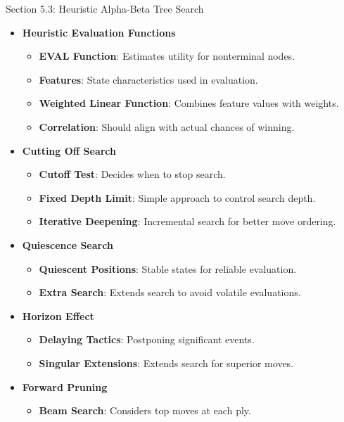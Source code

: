 \begin{notes}{Section 5.3: Heuristic Alpha-Beta Tree Search}
\begin{highlight}
        \begin{itemize}
            \item \textbf{Heuristic Evaluation Functions}
                \begin{itemize}
                    \item \textbf{EVAL Function}: Estimates utility for nonterminal nodes.
                    \item \textbf{Features}: State characteristics used in evaluation.
                    \item \textbf{Weighted Linear Function}: Combines feature values with weights.
                    \item \textbf{Correlation}: Should align with actual chances of winning.
                \end{itemize}
            \item \textbf{Cutting Off Search}
                \begin{itemize}
                    \item \textbf{Cutoff Test}: Decides when to stop search.
                    \item \textbf{Fixed Depth Limit}: Simple approach to control search depth.
                    \item \textbf{Iterative Deepening}: Incremental search for better move ordering.
                \end{itemize}
            \item \textbf{Quiescence Search}
                \begin{itemize}
                    \item \textbf{Quiescent Positions}: Stable states for reliable evaluation.
                    \item \textbf{Extra Search}: Extends search to avoid volatile evaluations.
                \end{itemize}
            \item \textbf{Horizon Effect}
                \begin{itemize}
                    \item \textbf{Delaying Tactics}: Postponing significant events.
                    \item \textbf{Singular Extensions}: Extends search for superior moves.
                \end{itemize}
            \item \textbf{Forward Pruning}
                \begin{itemize}
                    \item \textbf{Beam Search}: Considers top moves at each ply.

\end{itemize}
\end{itemize}
\end{highlight}
\end{notes}
